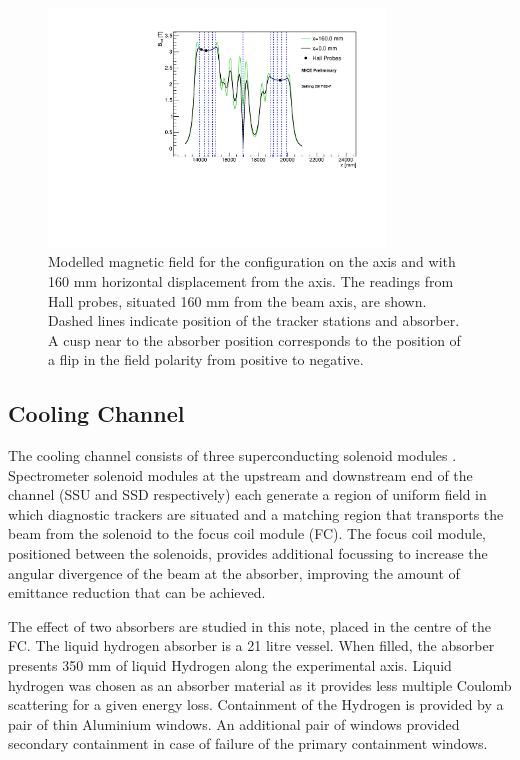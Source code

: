 \begin{figure}[!tbh]
    \centering
    \includegraphics*[width=0.8\textwidth]{03-Detectors/Figures/field_2017-02-7/bfield_vs_z}
    \caption{Modelled magnetic field for the configuration on the axis and with 
    160 mm horizontal displacement from the axis. The readings from Hall probes, 
    situated 160 mm from the beam axis, are shown. Dashed lines indicate 
    position of the tracker stations and absorber. A cusp near to the absorber
    position corresponds to the position of a flip in the field polarity from
    positive to negative. \label{fig:field}}
\end{figure}

\subsection{Cooling Channel}
The cooling channel consists of three superconducting solenoid modules \cite{SS} 
\cite{FC}. Spectrometer solenoid modules at the upstream and downstream end of 
the channel (SSU and SSD respectively) each generate a region of uniform 
field in which diagnostic trackers are situated and a matching region that 
transports the beam from the solenoid to the focus coil module (FC). The focus coil 
module, positioned between the solenoids, provides additional focussing to 
increase the angular divergence of the beam at the absorber, improving the 
amount of emittance reduction that can be achieved.

The effect of two absorbers are studied in this note, placed in the centre of 
the FC. The liquid hydrogen absorber is a 21 litre vessel. When filled, 
the absorber presents 350 mm 
of liquid Hydrogen along the experimental axis. Liquid hydrogen was chosen as an 
absorber material as it provides less multiple Coulomb  scattering for a given 
energy loss. Containment of
the Hydrogen is provided by a pair of thin Aluminium windows. An additional
pair of windows provided secondary containment in case of failure of the primary
containment windows.

